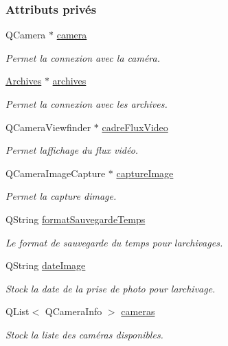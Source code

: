 \subsubsection*{Attributs privés}
\begin{DoxyCompactItemize}
\item 
Q\+Camera $\ast$ \hyperlink{class_camera_a282a199ddd33fe64bc27b32a55719054}{camera}
\begin{DoxyCompactList}\small\item\em Permet la connexion avec la caméra. \end{DoxyCompactList}\item 
\hyperlink{class_archives}{Archives} $\ast$ \hyperlink{class_camera_a5eb3a29aeeab2f2755d0b69ac7cf550a}{archives}
\begin{DoxyCompactList}\small\item\em Permet la connexion avec les archives. \end{DoxyCompactList}\item 
Q\+Camera\+Viewfinder $\ast$ \hyperlink{class_camera_abf5fd38d19f0f06dfd7ec9e37f73adb8}{cadre\+Flux\+Video}
\begin{DoxyCompactList}\small\item\em Permet l\textquotesingle{}affichage du flux vidéo. \end{DoxyCompactList}\item 
Q\+Camera\+Image\+Capture $\ast$ \hyperlink{class_camera_a482276c4fd0ba7172670006556322b62}{capture\+Image}
\begin{DoxyCompactList}\small\item\em Permet la capture d\textquotesingle{}image. \end{DoxyCompactList}\item 
Q\+String \hyperlink{class_camera_a1056fa6cffd2914d9e5a171bebf5ba7e}{format\+Sauvegarde\+Temps}
\begin{DoxyCompactList}\small\item\em Le format de sauvegarde du temps pour l\textquotesingle{}archivages. \end{DoxyCompactList}\item 
Q\+String \hyperlink{class_camera_a4433c250847de630592927b6c034f3c8}{date\+Image}
\begin{DoxyCompactList}\small\item\em Stock la date de la prise de photo pour l\textquotesingle{}archivage. \end{DoxyCompactList}\item 
Q\+List$<$ Q\+Camera\+Info $>$ \hyperlink{class_camera_a3bea5177e857533a53cb94135bee8c6b}{cameras}
\begin{DoxyCompactList}\small\item\em Stock la liste des caméras disponibles. \end{DoxyCompactList}\end{DoxyCompactItemize}


